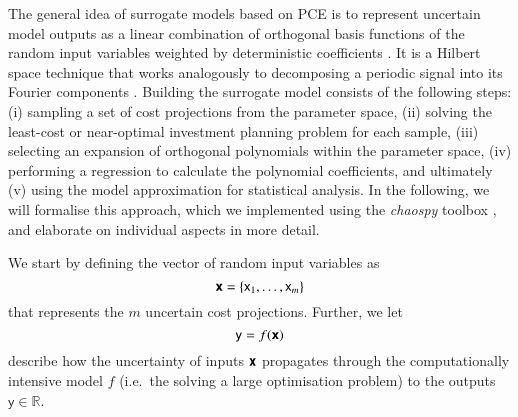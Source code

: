 
The general idea of surrogate models based on PCE is to
represent uncertain model outputs as a linear combination of orthogonal basis functions 
of the random input variables weighted by deterministic coefficients \cite{muhlpfordt_uncertainty_2020}.
It is a Hilbert space technique that works analogously to decomposing a periodic signal into its Fourier components \cite{muhlpfordt_uncertainty_2020}.
Building the surrogate model consists of the following steps:
(i) sampling a set of cost projections from the parameter space,
(ii) solving the least-cost or near-optimal investment planning problem for each sample,
(iii) selecting an expansion of orthogonal polynomials within the parameter space,
(iv) performing a regression to calculate the polynomial coefficients, and ultimately
(v) using the model approximation for statistical analysis.
In the following, we will formalise this approach,
which we implemented using the \textit{chaospy} toolbox \cite{feinberg_chaospy_2015},
and elaborate on individual aspects in more detail.

We start by defining the vector of random input variables as
\begin{equation}
    \boldsymbol{\mathsf{x}} = \{\mathsf{x}_1, \dots , \mathsf{x}_m\}
\end{equation}
that represents the $m$ uncertain cost projections.
Further, we let
\begin{equation}
    \mathsf{y} = f(\boldsymbol{\mathsf{x}})
\end{equation}
describe how the uncertainty of inputs $\boldsymbol{\mathsf{x}}$ propagates
through the computationally intensive model $f$
(i.e.~the solving a large optimisation problem)
to the outputs $\mathsf{y} \in \mathbb{R}$.

